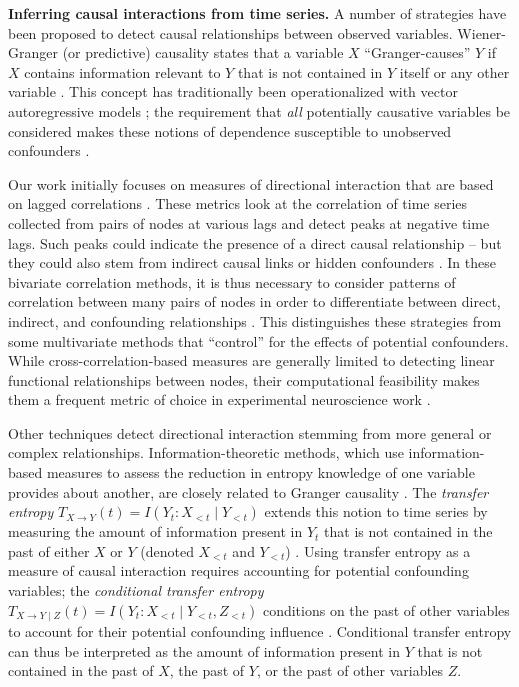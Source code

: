 \textbf{Inferring causal interactions from time series.} A number of
strategies have been proposed to detect causal relationships between
observed variables. Wiener-Granger (or predictive) causality states that
a variable \(X\) ``Granger-causes'' \(Y\) if \(X\) contains information
relevant to \(Y\) that is not contained in \(Y\) itself or any other
variable . This concept has traditionally been operationalized with
vector autoregressive models ; the requirement that \emph{all}
potentially causative variables be considered makes these notions of
dependence susceptible to unobserved confounders .

Our work initially focuses on measures of directional interaction that
are based on lagged correlations . These metrics look at the correlation
of time series collected from pairs of nodes at various lags and detect
peaks at negative time lags. Such peaks could indicate the presence of a
direct causal relationship -- but they could also stem from indirect
causal links or hidden confounders . In these bivariate correlation
methods, it is thus necessary to consider patterns of correlation
between many pairs of nodes in order to differentiate between direct,
indirect, and confounding relationships . This distinguishes these
strategies from some multivariate methods that ``control'' for the
effects of potential confounders. While cross-correlation-based measures
are generally limited to detecting linear functional relationships
between nodes, their computational feasibility makes them a frequent
metric of choice in experimental neuroscience work .

Other techniques detect directional interaction stemming from more
general or complex relationships. Information-theoretic methods, which
use information-based measures to assess the reduction in entropy
knowledge of one variable provides about another, are closely related to
Granger causality . The \emph{transfer entropy}
\(T_{X \to Y}(t) = I(Y_t \colon X_{<t} \mid Y_{<t})\) extends this
notion to time series by measuring the amount of information present in
\(Y_t\) that is not contained in the past of either \(X\) or \(Y\)
(denoted \(X_{<t}\) and \(Y_{<t}\)) . Using transfer entropy as a
measure of causal interaction requires accounting for potential
confounding variables; the \emph{conditional transfer entropy}
\(T_{X \to Y \mid Z}(t) = I(Y_t \colon X_{<t} \mid Y_{<t}, Z_{<t})\)
conditions on the past of other variables to account for their potential
confounding influence . Conditional transfer entropy can thus be
interpreted as the amount of information present in \(Y\) that is not
contained in the past of \(X\), the past of \(Y\), or the past of other
variables \(Z\).

